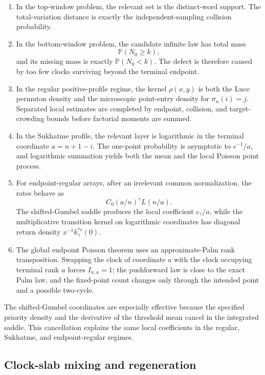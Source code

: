 \documentclass[11pt]{article}
\theoremstyle{remark}
\newcommand{\Pp}{\mathbb P}
\begin{document}
\begin{enumerate}[label=(\roman*)]
\item In the top-window problem, the relevant set is the distinct-word support.
The total-variation distance is exactly the independent-sampling collision
probability.

\item In the bottom-window problem, the candidate infinite law has total mass
\[
        \Pp(N_0\ge k),
\]
and its missing mass is exactly $\Pp(N_0<k)$.  The defect is therefore caused
by too few clocks surviving beyond the terminal endpoint.

\item In the regular positive-profile regime, the kernel $\rho(x,y)$ is both
the Luce permuton density and the microscopic point-entry density for
$\sigma_n(i)=j$.  Separated local estimates are completed by endpoint,
collision, and target-crowding bounds before factorial moments are summed.

\item In the Sukhatme profile, the relevant layer is logarithmic in the
terminal coordinate $a=n+1-i$.  The one-point probability is asymptotic to
$e^{-1}/a$, and logarithmic summation yields both the mean and the local Poisson
point process.

\item For endpoint-regular arrays, after an irrelevant common normalization,
the rates behave as
\[
        C_0(a/n)^\gamma L(n/a).
\]
The shifted-Gumbel saddle produces the local coefficient $c_\gamma/a$, while
the multiplicative transition kernel on logarithmic coordinates has diagonal
return density $x^{-1}k_\gamma^{*r}(0)$.

\item The global endpoint Poisson theorem uses an approximate-Palm rank
transposition.  Swapping the clock of coordinate $a$ with the clock occupying
terminal rank $a$ forces $I_{n,a}=1$; the pushforward law is close to the exact
Palm law, and the fixed-point count changes only through the intended point and
a possible two-cycle.
\end{enumerate}

The shifted-Gumbel coordinates are especially effective because the specified
priority density and the derivative of the threshold mean cancel in the
integrated saddle.  This cancellation explains the same local coefficients in
the regular, Sukhatme, and endpoint-regular regimes.

\subsection{Clock-slab mixing and regeneration}
\end{document}

